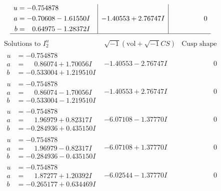 \documentclass[1p]{elsarticle_modified}
\theoremstyle{definition}
\newcommand{\I}{\sqrt{-1}}
\begin{document}
$$\begin{array}{c|c|c}
\begin{aligned}
u &= -0.754878\phantom{ +0.000000I} \\
a &= -0.70608 - 1.61550 I \\
b &= \phantom{-}0.64975 - 1.28372 I\end{aligned}
 & -1.40553 + 2.76747 I & \phantom{-0.000000 } 0\\
 \hline 
 \end{array}$$\newpage$$\begin{array}{c|c|c}  
\text{Solutions to }I^u_{2}& \I (\text{vol} + \sqrt{-1}CS) & \text{Cusp shape}\\
 \hline 
\begin{aligned}
u &= -0.754878\phantom{ +0.000000I} \\
a &= \phantom{-}0.86074 + 1.70056 I \\
b &= -0.533004 + 1.219510 I\end{aligned}
 & -1.40553 - 2.76747 I & \phantom{-0.000000 } 0 \\ \hline\begin{aligned}
u &= -0.754878\phantom{ +0.000000I} \\
a &= \phantom{-}0.86074 - 1.70056 I \\
b &= -0.533004 - 1.219510 I\end{aligned}
 & -1.40553 + 2.76747 I & \phantom{-0.000000 } 0 \\ \hline\begin{aligned}
u &= -0.754878\phantom{ +0.000000I} \\
a &= \phantom{-}1.96979 + 0.82317 I \\
b &= -0.284936 + 0.435150 I\end{aligned}
 & -6.07108 - 1.37770 I & \phantom{-0.000000 } 0 \\ \hline\begin{aligned}
u &= -0.754878\phantom{ +0.000000I} \\
a &= \phantom{-}1.96979 - 0.82317 I \\
b &= -0.284936 - 0.435150 I\end{aligned}
 & -6.07108 + 1.37770 I & \phantom{-0.000000 } 0 \\ \hline\begin{aligned}
u &= -0.754878\phantom{ +0.000000I} \\
a &= \phantom{-}1.87277 + 1.20392 I \\
b &= -0.265177 + 0.634469 I\end{aligned}
 & -6.02544 - 1.37770 I & \phantom{-0.000000 } 0 \\ \hline\begin{aligned}

\end{aligned}
\end{array}$$
\end{document}
